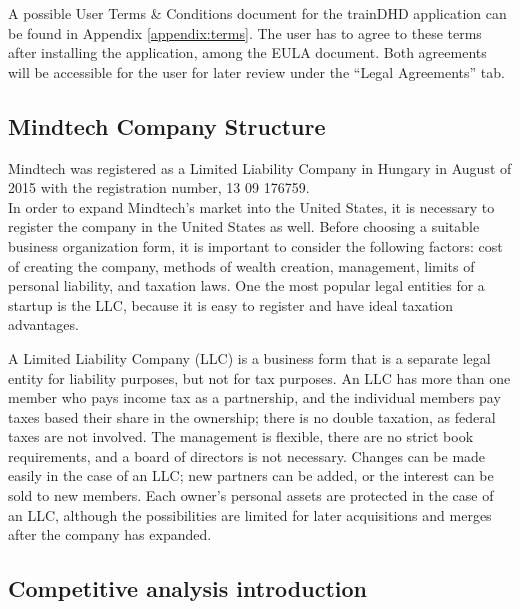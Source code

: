 \documentclass[letterpaper,10pt]{article}
\let\oldsubsection\subsection
\renewcommand{\subsection}{\def\cursectioning{subsection}\oldsubsection}
\begin{document}
A possible User Terms \& Conditions document for the trainDHD application can be found in Appendix \ref{appendix:terms}. The user has to agree to these terms after installing the application, among the EULA document. Both agreements will be accessible for the user for later review under the “Legal Agreements” tab. 

\subsection{Mindtech Company Structure}

Mindtech was registered as a Limited Liability Company in Hungary in August of 2015 with the registration number, 13 09 176759. \\
In order to expand Mindtech's market into the United States, it is necessary to register the company in the United States as well. Before choosing a suitable business organization form, it is important to consider the following factors: cost of creating the company, methods of wealth creation, management, limits of personal liability, and taxation laws. 
One the most popular legal entities for a startup is the LLC, because it is easy to register and have ideal taxation advantages.  

A Limited Liability Company (LLC) is a business form that is a separate legal entity for liability purposes, but not for tax purposes. An LLC has more than one member who pays income tax as a partnership, and the individual members pay taxes based their share in the ownership; there is no double taxation, as federal taxes are not involved. The management is flexible, there are no strict book requirements, and a board of directors is not necessary. Changes can be made easily in the case of an LLC; new partners can be added, or the interest can be sold to new members. Each owner’s personal assets are protected in the case of an LLC, although the possibilities are limited for later acquisitions and merges after the company has expanded. \cite{boitnott}





\subsection{Competitive analysis introduction}
\end{document}
